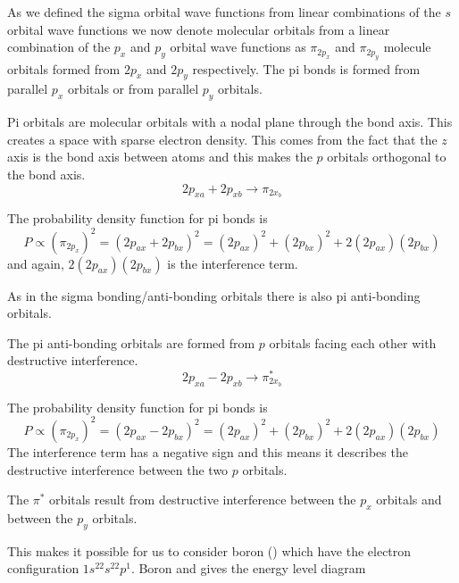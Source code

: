 \documentclass[../mit-general-chemistry.tex]{subfiles}
\begin{document}
As we defined the sigma orbital wave functions from linear
combinations of the $s$ orbital wave functions we now denote molecular
orbitals from a linear combination of the $p_x$ and $p_y$ orbital wave
functions as $\pi_{2p_x}$ and $\pi_{2p_y}$ molecule orbitals formed
from $2p_x$ and $2p_y$ respectively. The pi bonds is formed from
parallel $p_x$ orbitals or from parallel $p_y$ orbitals.

Pi orbitals are molecular orbitals with a nodal plane through the bond
axis. This creates a space with sparse electron density. This comes
from the fact that the $z$ axis is the bond axis between atoms and
this makes the $p$ orbitals orthogonal to the bond axis.
\begin{equation*}
  2p_{xa} + 2p_{xb} \longrightarrow \pi_{2x_b}
\end{equation*}

The probability density function for pi bonds is
\begin{equation*}
  P \propto (\pi_{2p_x})^2 = (2p_{ax} + 2p_{bx})^2
  = (2p_{ax})^2 + (2p_{bx})^2 + 2(2p_{ax})(2p_{bx})
\end{equation*}
and again, $2(2p_{ax})(2p_{bx})$ is the interference term.

As in the sigma bonding/anti-bonding orbitals there is also pi
anti-bonding orbitals.

The pi anti-bonding orbitals are formed from $p$ orbitals facing
each other with destructive interference.
\begin{equation*}
  2p_{xa} - 2p_{xb} \longrightarrow \pi^*_{2x_b}
\end{equation*}

The probability density function for pi bonds is
\begin{equation*}
  P \propto (\pi_{2p_x})^2 = (2p_{ax} - 2p_{bx})^2
  = (2p_{ax})^2 + (2p_{bx})^2 + 2(2p_{ax})(2p_{bx})
\end{equation*}
The interference term has a negative sign and this means it describes
the destructive interference between the two $p$ orbitals. 

The $\pi^*$ orbitals result from destructive interference between the
$p_x$ orbitals and between the $p_y$ orbitals.

This makes it possible for us to consider boron () which have
the electron configuration $1s^22s^22p^1$. Boron and  gives the
energy level diagram

\begin{center}
  \begin{MOdiagram}[names,labels,labels-fs=\footnotesize]
    \EnergyAxis[title=$E$]
  \end{MOdiagram}
\end{center}
\end{document}
